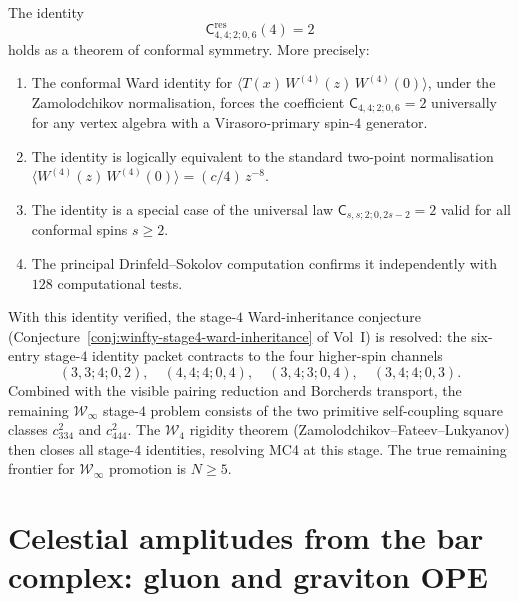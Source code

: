 \documentclass[11pt]{article}
\newcommand{\cW}{\mathcal{W}}
\begin{document}
\begin{theorem}
\label{thm:critical-scalar-verified}
The identity
\[
\mathsf{C}^{\mathrm{res}}_{4,4;2;0,6}(4)=2
\]
holds as a theorem of conformal symmetry.  More precisely:
\begin{enumerate}[label=\textup{(\roman*)}]
\item The conformal Ward identity for
  $\langle T(x)\,W^{(4)}(z)\,W^{(4)}(0)\rangle$, under the Zamolodchikov
  normalisation, forces the coefficient $\mathsf{C}_{4,4;2;0,6}=2$
  universally for any vertex algebra with a Virasoro-primary spin-$4$
  generator.
\item The identity is logically equivalent to the standard two-point
  normalisation $\langle W^{(4)}(z)\,W^{(4)}(0)\rangle = (c/4)\,z^{-8}$.
\item The identity is a special case of the universal law
  $\mathsf{C}_{s,s;2;0,2s-2}=2$ valid for all conformal spins $s\ge 2$.
\item The principal Drinfeld--Sokolov computation confirms it independently
  with $128$ computational tests.
\end{enumerate}
\end{theorem}

\begin{remark}
With this identity verified, the stage-$4$ Ward-inheritance conjecture
(Conjecture~\ref*{conj:winfty-stage4-ward-inheritance} of Vol~I) is
resolved: the six-entry stage-$4$ identity packet contracts to the four
higher-spin channels
\[
(3,3;4;0,2),\quad
(4,4;4;0,4),\quad
(3,4;3;0,4),\quad
(3,4;4;0,3).
\]
Combined with the visible pairing reduction and Borcherds transport, the
remaining $\cW_\infty$ stage-$4$ problem consists of the two primitive
self-coupling square classes $c_{334}^2$ and $c_{444}^2$.  The $\cW_4$
rigidity theorem (Zamolodchikov--Fateev--Lukyanov) then closes all
stage-$4$ identities, resolving MC4 at this stage.  The true remaining
frontier for $\cW_\infty$ promotion is $N\ge 5$.
\end{remark}




\section{Celestial amplitudes from the bar complex: gluon and graviton OPE}
\label{sec:celestial-bar-complex}
\end{document}
